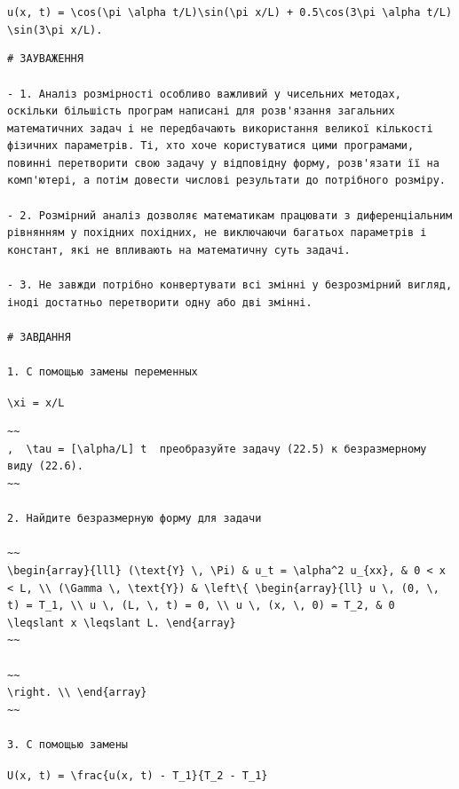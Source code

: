 \documentclass[
  ukrainian,
]{article}
\begin{document}
\texttt{u(x,\ t)\ =\ \textbackslash{}cos(\textbackslash{}pi\ \textbackslash{}alpha\ t/L)\textbackslash{}sin(\textbackslash{}pi\ x/L)\ +\ 0.5\textbackslash{}cos(3\textbackslash{}pi\ \textbackslash{}alpha\ t/L)\textbackslash{}sin(3\textbackslash{}pi\ x/L).}

\begin{verbatim}
# ЗАУВАЖЕННЯ

- 1. Аналіз розмірності особливо важливий у чисельних методах, оскільки більшість програм написані для розв'язання загальних математичних задач і не передбачають використання великої кількості фізичних параметрів. Ті, хто хоче користуватися цими програмами, повинні перетворити свою задачу у відповідну форму, розв'язати її на комп'ютері, а потім довести числові результати до потрібного розміру.

- 2. Розмірний аналіз дозволяє математикам працювати з диференціальним рівнянням у похідних похідних, не виключаючи багатьох параметрів і констант, які не впливають на математичну суть задачі.

- 3. Не завжди потрібно конвертувати всі змінні у безрозмірний вигляд, іноді достатньо перетворити одну або дві змінні.

# ЗАВДАННЯ

1. С помощью замены переменных
\end{verbatim}

\texttt{\textbackslash{}xi\ =\ x/L}

\begin{verbatim}
~~
,  \tau = [\alpha/L] t  преобразуйте задачу (22.5) к безразмерному виду (22.6).
~~

2. Найдите безразмерную форму для задачи

~~
\begin{array}{lll} (\text{Y} \, \Pi) & u_t = \alpha^2 u_{xx}, & 0 < x < L, \\ (\Gamma \, \text{Y}) & \left\{ \begin{array}{ll} u \, (0, \, t) = T_1, \\ u \, (L, \, t) = 0, \\ u \, (x, \, 0) = T_2, & 0 \leqslant x \leqslant L. \end{array}
~~

~~
\right. \\ \end{array}
~~

3. С помощью замены
\end{verbatim}

\texttt{U(x,\ t)\ =\ \textbackslash{}frac\{u(x,\ t)\ -\ T\_1\}\{T\_2\ -\ T\_1\}}
\end{document}

